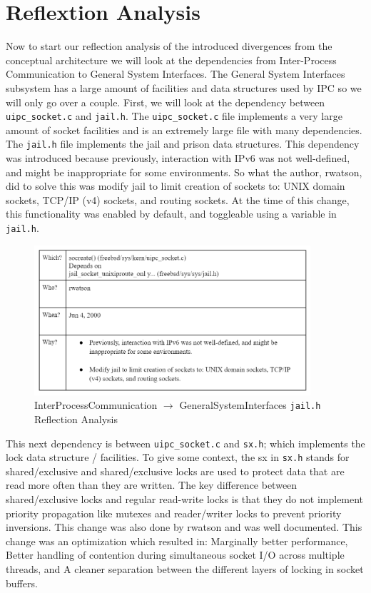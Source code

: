 \documentclass[12pt, dvipsnames, a4paper]{article}
\newcommand{\code}[1]{\texttt{#1}}
\begin{document}
\section{Reflextion Analysis}
Now to start our reflection analysis of the introduced divergences from the conceptual architecture  we will look at the dependencies from Inter-Process Communication to General System Interfaces. The General System Interfaces subsystem has a large amount of facilities and data structures used by IPC so we will only go over a couple. First, we will look at the dependency between \code{uipc\_socket.c} and \code{jail.h}. The \code{uipc\_socket.c} file implements a very large amount of socket facilities and is an extremely large file with many dependencies. The \code{jail.h} file implements the jail and prison data structures. This dependency was introduced because previously, interaction with IPv6 was not well-defined, and might be inappropriate for some environments. So what the author, rwatson, did to solve this was modify jail to limit creation of sockets to: UNIX domain sockets, TCP/IP (v4) sockets, and routing sockets. At the time of this change, this functionality was enabled by default, and toggleable using a variable in \code{jail.h}.
\begin{figure}[!htb]
	\centering
	\includegraphics[width=290pt]{assets/IPC_Jail.png}
	\caption{InterProcessCommunication $\longrightarrow$ GeneralSystemInterfaces \code{jail.h} Reflection Analysis}
\end{figure}

This next dependency is between \code{uipc\_socket.c} and \code{sx.h}; which implements the lock data structure / facilities. To give some context, the sx in \code{sx.h} stands for shared/exclusive and shared/exclusive locks are used to protect data that are read more often than they are written. The key difference between shared/exclusive locks and regular read-write locks is that they do not implement priority propagation like mutexes and reader/writer locks to prevent priority inversions. This change was also done by rwatson and was well documented. This change was an optimization which resulted in: Marginally better performance, Better handling of contention during simultaneous socket I/O across multiple threads, and A cleaner separation between the different layers of locking in socket buffers.
\end{document}
